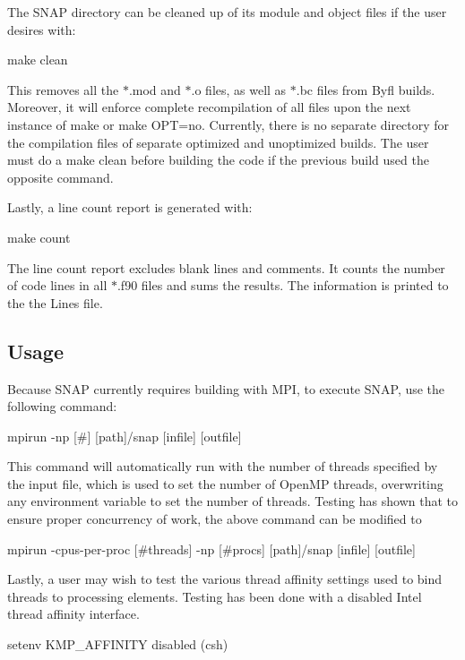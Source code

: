 The S\-N\-A\-P directory can be cleaned up of its module and object files if the user desires with\-: \begin{DoxyVerb}make clean
\end{DoxyVerb}


This removes all the {\ttfamily $\ast$.mod} and {\ttfamily $\ast$.o} files, as well as {\ttfamily $\ast$.bc} files from Byfl builds. Moreover, it will enforce complete recompilation of all files upon the next instance of {\ttfamily make} or {\ttfamily make O\-P\-T=no}. Currently, there is no separate directory for the compilation files of separate optimized and unoptimized builds. The user must do a {\ttfamily make clean} before building the code if the previous build used the opposite command.

Lastly, a line count report is generated with\-: \begin{DoxyVerb}make count
\end{DoxyVerb}


The line count report excludes blank lines and comments. It counts the number of code lines in all {\ttfamily $\ast$.f90} files and sums the results. The information is printed to the the {\ttfamily Lines} file.

\subsection*{Usage}

Because S\-N\-A\-P currently requires building with M\-P\-I, to execute S\-N\-A\-P, use the following command\-: \begin{DoxyVerb}mpirun -np [#] [path]/snap [infile] [outfile]
\end{DoxyVerb}


This command will automatically run with the number of threads specified by the input file, which is used to set the number of Open\-M\-P threads, overwriting any environment variable to set the number of threads. Testing has shown that to ensure proper concurrency of work, the above command can be modified to \begin{DoxyVerb}mpirun -cpus-per-proc [#threads] -np [#procs] [path]/snap [infile] [outfile]
\end{DoxyVerb}


Lastly, a user may wish to test the various thread affinity settings used to bind threads to processing elements. Testing has been done with a disabled Intel thread affinity interface. \begin{DoxyVerb}setenv KMP_AFFINITY disabled (csh)
\end{DoxyVerb}


